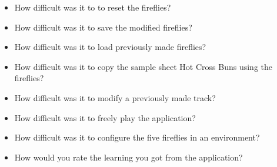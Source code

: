 \begin{itemize}
    \item How difficult was it to to reset the fireflies?
    \item How difficult was it to save the modified fireflies?
    \item How difficult was it to load previously made fireflies?
    \item How difficult was it to copy the sample sheet Hot Cross Buns using the fireflies? 
    \item How difficult was it to modify a previously made track? 
    \item How difficult was it to freely play the application?
    \item How difficult was it to configure the five fireflies in an environment?
    \item How would you rate the learning you got from the application?
\end{itemize}






